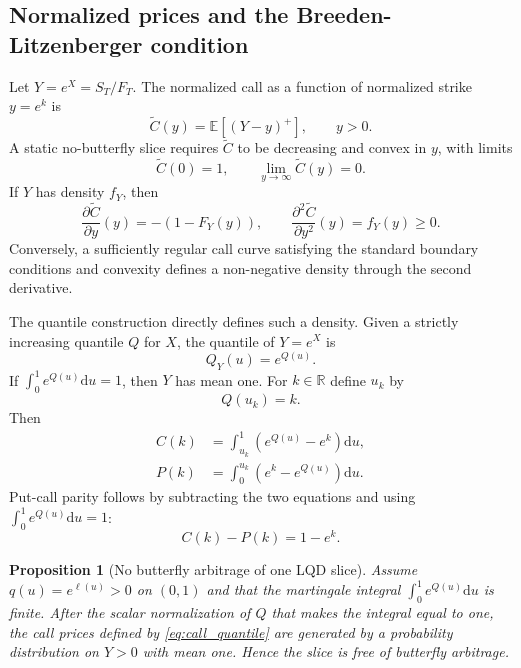 \documentclass[11pt]{article}
\newtheorem{proposition}{Proposition}
\newcommand{\R}{\mathbb{R}}
\newcommand{\E}{\mathbb{E}}
\newcommand{\dd}{\mathrm{d}}
\newcommand{\1}{\mathbf{1}}
\begin{document}
\subsection{Normalized prices and the Breeden-Litzenberger condition}

Let $Y=e^X=S_T/F_T$.  The normalized call as a function of normalized strike $y=e^k$ is
\begin{equation}
    \widetilde C(y)=\E[(Y-y)^+],\qquad y>0.
\end{equation}
A static no-butterfly slice requires $\widetilde C$ to be decreasing and convex in $y$, with limits
\begin{equation}
    \widetilde C(0)=1,\qquad \lim_{y\to\infty}\widetilde C(y)=0.
\end{equation}
If $Y$ has density $f_Y$, then
\begin{equation}
    \frac{\partial \widetilde C}{\partial y}(y)=-(1-F_Y(y)),
    \qquad
    \frac{\partial^2 \widetilde C}{\partial y^2}(y)=f_Y(y)\ge 0. \label{eq:BL}
\end{equation}
Conversely, a sufficiently regular call curve satisfying the standard boundary conditions and convexity defines a non-negative density through the second derivative.

The quantile construction directly defines such a density.  Given a strictly increasing quantile $Q$ for $X$, the quantile of $Y=e^X$ is
\begin{equation}
    Q_Y(u)=e^{Q(u)}.
\end{equation}
If $\int_0^1e^{Q(u)}\dd u=1$, then $Y$ has mean one.  For $k\in\R$ define $u_k$ by
\begin{equation}
    Q(u_k)=k. \label{eq:uk_def}
\end{equation}
Then
\begin{align}
    C(k)&=\int_{u_k}^{1}\left(e^{Q(u)}-e^k\right)\dd u, \label{eq:call_quantile}\\
    P(k)&=\int_{0}^{u_k}\left(e^k-e^{Q(u)}\right)\dd u. \label{eq:put_quantile}
\end{align}
Put-call parity follows by subtracting the two equations and using $\int_0^1e^{Q(u)}\dd u=1$:
\begin{equation}
    C(k)-P(k)=1-e^k.
\end{equation}

\begin{proposition}[No butterfly arbitrage of one LQD slice]
Assume $q(u)=e^{\ell(u)}>0$ on $(0,1)$ and that the martingale integral $\int_0^1e^{Q(u)}\dd u$ is finite.  After the scalar normalization of $Q$ that makes the integral equal to one, the call prices defined by \eqref{eq:call_quantile} are generated by a probability distribution on $Y>0$ with mean one.  Hence the slice is free of butterfly arbitrage.
\end{proposition}
\end{document}
